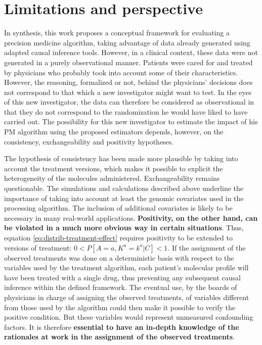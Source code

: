 \documentclass[a4paper,12pt,twoside,onecolumn,openright,final,oldfontcommands]{memoir}
\begin{document}
\section{Limitations and perspective}\label{limitations-and-perspective}

In synthesis, this work proposes a conceptual framework for evaluating a
precision medicine algorithm, taking advantage of data already generated
using adapted causal inference tools. However, in a clinical context,
these data were not generated in a purely observational manner. Patients
were cared for and treated by physicians who probably took into account
some of their characteristics. However, the reasoning, formalized or
not, behind the physicians' decisions does not correspond to that which
a new investigator might want to test. In the eyes of this new
investigator, the data can therefore be considered as observational in
that they do not correspond to the randomization he would have liked to
have carried out. The possibility for this new investigator to estimate
the impact of his PM algorithm using the proposed estimators depends,
however, on the consistency, exchangeability and positivity hypotheses.

The hypothesis of consistency has been made more plausible by taking
into account the treatment versions, which makes it possible to explicit
the heterogeneity of the molecules administered. Exchangeability remains
questionable. The simulations and calculations described above underline
the importance of taking into account at least the genomic covariates
used in the processing algorithm. The inclusion of additional covariates
is likely to be necessary in many real-world applications.
\textbf{Positivity, on the other hand, can be violated in a much more
obvious way in certain situations}. Thus, equation
\eqref{eq:distrib-treatment-effect} requires positivity to be extended to
versions of treatment: \(0<P[A=a, K^a=k^a|C]<1\). If the assignment of
the observed treatments was done on a deterministic basis with respect
to the variables used by the treatment algorithm, each patient's
molecular profile will have been treated with a single drug, thus
preventing any subsequent causal inference within the defined framework.
The eventual use, by the boards of physicians in charge of assigning the
observed treatments, of variables different from those used by the
algorithm could then make it possible to verify the positive condition.
But these variables would represent unmeasured confounding factors. It
is therefore \textbf{essential to have an in-depth knowledge of the
rationales at work in the assignment of the observed treatments}.
\end{document}
